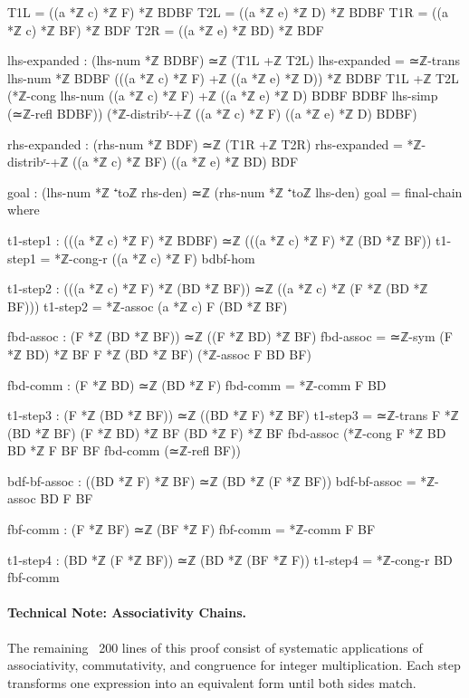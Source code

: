 \documentclass[11pt,a4paper]{book}
\begin{document}
\begin{code}
    T1L = ((a *ℤ c) *ℤ F) *ℤ BDBF
    T2L = ((a *ℤ e) *ℤ D) *ℤ BDBF
    T1R = ((a *ℤ c) *ℤ BF) *ℤ BDF
    T2R = ((a *ℤ e) *ℤ BD) *ℤ BDF

    lhs-expanded : (lhs-num *ℤ BDBF) ≃ℤ (T1L +ℤ T2L)
    lhs-expanded = ≃ℤ-trans {lhs-num *ℤ BDBF} 
                    {(((a *ℤ c) *ℤ F) +ℤ ((a *ℤ e) *ℤ D)) *ℤ BDBF}
                    {T1L +ℤ T2L}
                    (*ℤ-cong {lhs-num} {((a *ℤ c) *ℤ F) +ℤ ((a *ℤ e) *ℤ D)} 
                             {BDBF} {BDBF} lhs-simp (≃ℤ-refl BDBF))
                    (*ℤ-distribʳ-+ℤ ((a *ℤ c) *ℤ F) ((a *ℤ e) *ℤ D) BDBF)

    rhs-expanded : (rhs-num *ℤ BDF) ≃ℤ (T1R +ℤ T2R)
    rhs-expanded = *ℤ-distribʳ-+ℤ ((a *ℤ c) *ℤ BF) ((a *ℤ e) *ℤ BD) BDF

    goal : (lhs-num *ℤ ⁺toℤ rhs-den) ≃ℤ (rhs-num *ℤ ⁺toℤ lhs-den)
    goal = final-chain
      where
        
        t1-step1 : (((a *ℤ c) *ℤ F) *ℤ BDBF) ≃ℤ (((a *ℤ c) *ℤ F) *ℤ (BD *ℤ BF))
        t1-step1 = *ℤ-cong-r ((a *ℤ c) *ℤ F) bdbf-hom
        
        t1-step2 : (((a *ℤ c) *ℤ F) *ℤ (BD *ℤ BF)) ≃ℤ ((a *ℤ c) *ℤ (F *ℤ (BD *ℤ BF)))
        t1-step2 = *ℤ-assoc (a *ℤ c) F (BD *ℤ BF)
        
        fbd-assoc : (F *ℤ (BD *ℤ BF)) ≃ℤ ((F *ℤ BD) *ℤ BF)
        fbd-assoc = ≃ℤ-sym {(F *ℤ BD) *ℤ BF} {F *ℤ (BD *ℤ BF)} (*ℤ-assoc F BD BF)
        
        fbd-comm : (F *ℤ BD) ≃ℤ (BD *ℤ F)
        fbd-comm = *ℤ-comm F BD
        
        t1-step3 : (F *ℤ (BD *ℤ BF)) ≃ℤ ((BD *ℤ F) *ℤ BF)
        t1-step3 = ≃ℤ-trans {F *ℤ (BD *ℤ BF)} {(F *ℤ BD) *ℤ BF} {(BD *ℤ F) *ℤ BF}
                    fbd-assoc 
                    (*ℤ-cong {F *ℤ BD} {BD *ℤ F} {BF} {BF} fbd-comm (≃ℤ-refl BF))
        
        bdf-bf-assoc : ((BD *ℤ F) *ℤ BF) ≃ℤ (BD *ℤ (F *ℤ BF))
        bdf-bf-assoc = *ℤ-assoc BD F BF
        
        fbf-comm : (F *ℤ BF) ≃ℤ (BF *ℤ F)
        fbf-comm = *ℤ-comm F BF
        
        t1-step4 : (BD *ℤ (F *ℤ BF)) ≃ℤ (BD *ℤ (BF *ℤ F))
        t1-step4 = *ℤ-cong-r BD fbf-comm
\end{code}

\paragraph{Technical Note: Associativity Chains.}
The remaining ~200 lines of this proof consist of systematic applications of associativity, 
commutativity, and congruence for integer multiplication. Each step transforms one expression 
into an equivalent form until both sides match.
\end{document}

